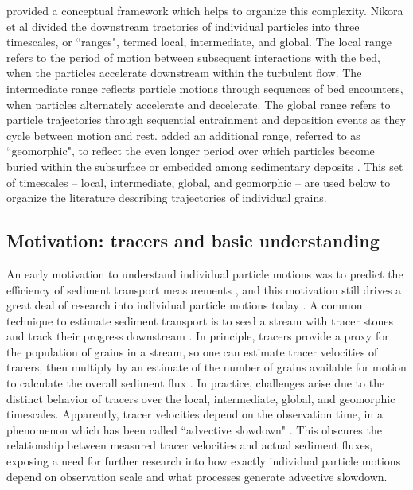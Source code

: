\citet{Nikora2001,Nikora2002} provided a conceptual framework which helps to organize this complexity.
Nikora et al divided the downstream tractories of individual particles into three timescales, or ``ranges", termed local, intermediate, and global.
The local range refers to the period of motion between subsequent interactions with the bed, when the particles accelerate downstream within the turbulent flow.
The intermediate range reflects particle motions through sequences of bed encounters, when particles alternately accelerate and decelerate. 
The global range refers to particle trajectories through sequential entrainment and deposition events as they cycle between motion and rest.
\citet{Hassan2017} added an additional range, referred to as ``geomorphic", to reflect the even longer period over which particles become buried within the subsurface or embedded among sedimentary deposits \citep{Bradley2017}.
This set of timescales -- local, intermediate, global, and geomorphic -- are used below to organize the literature describing trajectories of individual grains.

\subsection{Motivation: tracers and basic understanding}
An early motivation to understand individual particle motions was to predict the efficiency of sediment transport measurements \citep{Ettema2004}, and this motivation still drives a great deal of research into individual particle motions today \citep{Hassan2017,Pretzlav2021}.
A common technique to estimate sediment transport is to seed a stream with tracer stones and track their progress downstream \citep{Einstein1937, Takayama1965, Pretzlav2021}.
In principle, tracers provide a proxy for the population of grains in a stream, so one can estimate tracer velocities of tracers, then multiply by an estimate of the number of grains available for motion to calculate the overall sediment flux \citep{Wilcock1997a,Ferguson2002}.
In practice, challenges arise due to the distinct behavior of tracers over the local, intermediate, global, and geomorphic timescales. Apparently, tracer velocities depend on the observation time, in a phenomenon which has been called ``advective slowdown" \citep{Ferguson2002,Haschenburger2011, Haschenburger2013, Pelosi2016}. This obscures the relationship between measured tracer velocities and actual sediment fluxes, exposing a need for further research into how exactly individual particle motions depend on observation scale and what processes generate advective slowdown.

